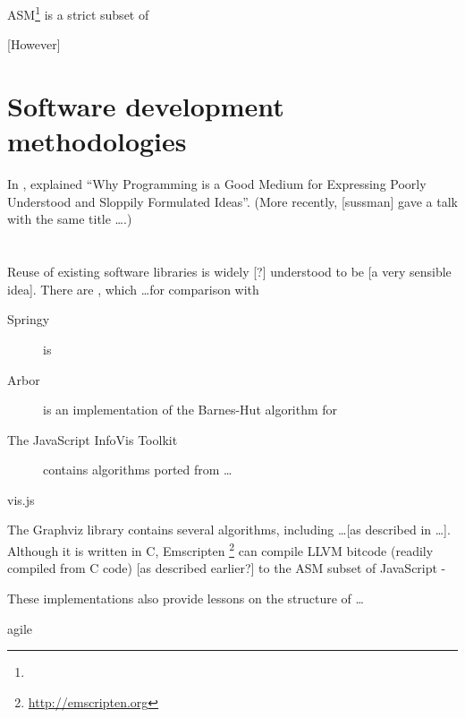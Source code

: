 ASM\footnote{} is a strict subset of 

[However]


\section{Software development methodologies}

In \citeyear{67poorslop}, \citet*{67poorslop} explained ``Why Programming is a Good Medium for Expressing Poorly Understood and Sloppily Formulated Ideas''.
(More recently, [sussman] gave a talk with the same title \ldots {}.)


\section{}

Reuse of existing software libraries is widely [?] understood to be [a very sensible idea]. There are , which \ldots for comparison with 

\begin{description}
  \item[Springy] is
  \item[Arbor] is an implementation of the Barnes-Hut algorithm for 
  \item[The JavaScript InfoVis Toolkit] contains algorithms ported from \ldots
  \item[vis.js]
\end{description}

The Graphviz library contains several algorithms, including \ldots [as described in \ldots]. Although it is written in C, Emscripten \footnote{\url{http://emscripten.org}} can compile LLVM bitcode (readily compiled from C code) [as described earlier?] to the ASM subset of JavaScript -

These implementations also provide lessons on the structure of \ldots



agile
